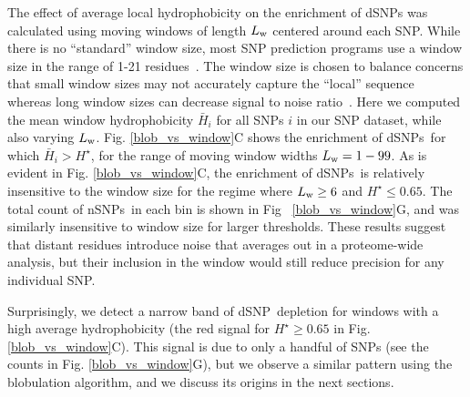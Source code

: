 \documentclass[9pt,twocolumn,twoside,lineno]{pnas-new}
\newcommand{\dSNPs}{dSNPs~}
\newcommand{\nSNPs}{nSNPs~}
\newcommand{\dSNP}{dSNP~}
\newcommand{\Ht}{H^{\star}}
\newcommand{\Lw}{L_{\rm w}}
\begin{document}
The effect of average local hydrophobicity on the enrichment of dSNPs was calculated using moving windows of length $\Lw$ centered around each SNP. 
While there is no ``standard'' window size, most SNP prediction programs use a window size in the range of 1-21 residues~\citep{Teng2010, Capriotti2006, Capriotti2017, Hecht2015}. The window size is chosen to balance concerns that small window sizes may not accurately capture the ``local'' sequence~\citep{Chen2006, Schlessinger2005, Sander2006} whereas long window sizes can decrease signal to noise ratio~\citep{Park2007}.  Here we computed the mean window hydrophobicity $\bar{H}_i$ for all SNPs $i$ in our SNP dataset, while also varying $\Lw$. Fig. \ref{blob_vs_window}C shows the enrichment of \dSNPs for which $\bar{H}_i > \Ht$, for the range of moving window widths $\Lw=1-99$. As is evident in Fig. \ref{blob_vs_window}C, the enrichment of \dSNPs is relatively insensitive to the window size for the regime where $\Lw \ge 6$ and $\Ht \le 0.65$. The total count of \nSNPs in each bin is shown in Fig ~\ref{blob_vs_window}G, and was similarly insensitive to window size for larger thresholds. These results suggest that distant residues introduce noise that averages out in a proteome-wide analysis, but their inclusion in the window would still reduce precision for any individual SNP. 

Surprisingly, we detect a narrow band of \dSNP depletion for windows with a high average hydrophobicity (the red signal for $\Ht\ge 0.65$ in Fig. \ref{blob_vs_window}C). This signal is due to only a handful of SNPs (see the counts in Fig. \ref{blob_vs_window}G), but we observe a similar pattern using the blobulation algorithm, and we discuss its origins in the next sections.
\end{document}
